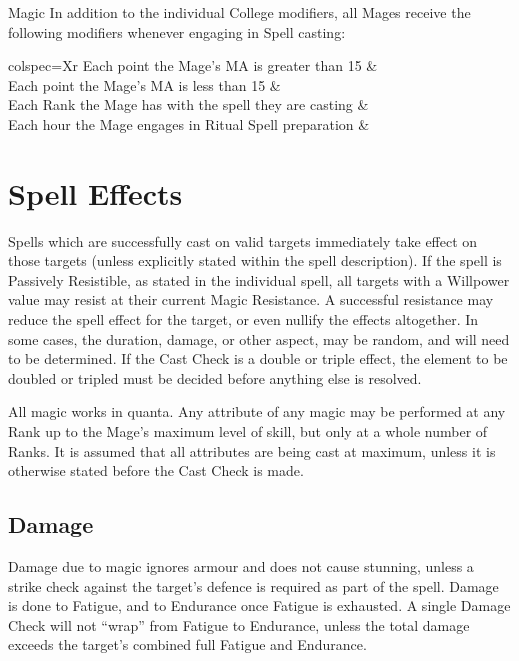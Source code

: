 \begin{Chapter}{Magic}
In addition to the individual College modifiers, all Mages receive the
following modifiers whenever engaging in Spell casting:

\begin{dqtblr}{colspec={Xr}}
Each point the Mage’s MA is greater than 15		&  \\
Each point the Mage’s MA is less than 15		&  \\
Each Rank the Mage has with the spell they are casting	&  \\ 
Each hour the Mage engages in Ritual Spell preparation	&  \\
\end{dqtblr}


\section{Spell Effects}
\label{magic:effects}

Spells which are successfully cast on valid targets immediately take
effect on those targets (unless explicitly stated within the spell
description). If the spell is Passively Resistible, as stated in the
individual spell, all targets with a Willpower value may resist at
their current Magic Resistance.  A successful resistance may reduce
the spell effect for the target, or even nullify the effects
altogether.  In some cases, the duration, damage, or other aspect, may
be random, and will need to be determined.  If the Cast Check is a
double or triple effect, the element to be doubled or tripled must be
decided before anything else is resolved.

All magic works in quanta.  Any attribute of any magic may be
performed at any Rank up to the Mage’s maximum level of skill, but
only at a whole number of Ranks.  It is assumed that all attributes
are being cast at maximum, unless it is otherwise stated before the
Cast Check is made.

\subsection{Damage}

Damage due to magic ignores armour and does not cause stunning, unless
a strike check against the target’s defence is required as part of the
spell.  Damage is done to Fatigue, and to Endurance once Fatigue is
exhausted. A single Damage Check will not “wrap” from Fatigue to
Endurance, unless the total damage exceeds the target’s combined full
Fatigue and Endurance.


\end{Chapter}
